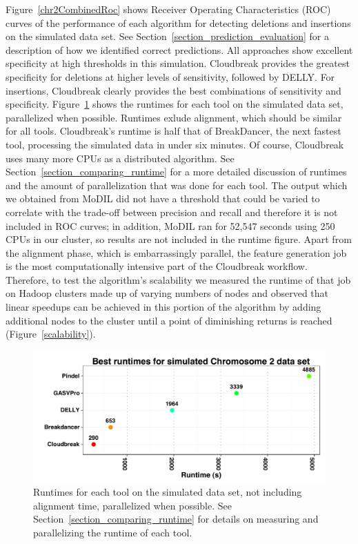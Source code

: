 Figure~\ref{chr2CombinedRoc} shows Receiver Operating Characteristics (ROC) curves of the performance of each algorithm for detecting deletions and insertions on the simulated data set. See Section~\ref{section_prediction_evaluation} for a description of how we identified correct predictions. All approaches show excellent specificity at high thresholds in this simulation. Cloudbreak provides the greatest specificity for deletions at higher levels of sensitivity, followed by DELLY. For insertions, Cloudbreak clearly provides the best combinations of sensitivity and specificity. Figure~\ref{chr2BestRuntimes} shows the runtimes for each tool on the simulated data set, parallelized when possible. Runtimes exlude alignment, which should be similar for all tools. Cloudbreak's runtime is half that of BreakDancer, the next fastest tool, processing the simulated data in under six minutes. Of course, Cloudbreak uses many more CPUs as a distributed algorithm. See Section~\ref{section_comparing_runtime} for a more detailed discussion of runtimes and the amount of parallelization that was done for each tool. The output which we obtained from MoDIL did not have a threshold that could be varied to correlate with the trade-off between precision and recall and therefore it is not included in ROC curves; in addition, MoDIL ran for 52,547 seconds using 250 CPUs in our cluster, so results are not included in the runtime figure. Apart from the alignment phase, which is embarrassingly parallel, the feature generation job is the most computationally intensive part of the Cloudbreak workflow. Therefore, to test the algorithm's scalability we measured the runtime of that job on Hadoop clusters made up of varying numbers of nodes and observed that linear speedups can be achieved in this portion of the algorithm by adding additional nodes to the cluster until a point of diminishing returns is reached (Figure~\ref{scalability}).

\begin{figure}
\centering
\includegraphics[width=1\textwidth]{figures/chr2BestRuntimes_horizontal.pdf}
\caption{Runtimes for each tool on the simulated data set, not including alignment time, parallelized when possible. See Section~\ref{section_comparing_runtime} for details on measuring and parallelizing the runtime of each tool.}
\label{chr2BestRuntimes}
\end{figure}

